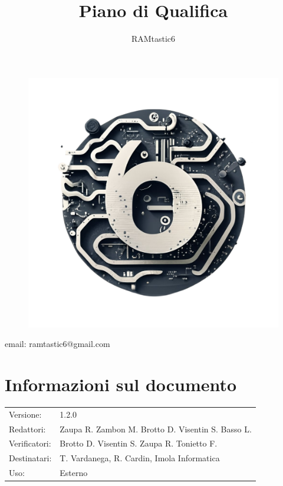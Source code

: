 \documentclass[12pt, oneside]{article}
\author{RAMtastic6}
\begin{document}
\thispagestyle{empty}
\title{Piano di Qualifica}
\maketitle
\begin{figure}[h]
  \centering
  \includegraphics[scale=0.3]{logo.png}
\end{figure}
\begin{center}
    email: ramtastic6@gmail.com
\end{center}

\section*{Informazioni sul documento}
\begin{tabular}{ll}
Versione: & 1.2.0 \\
Redattori: & Zaupa R. Zambon M. Brotto D. Visentin S. Basso L.\\
Verificatori: & Brotto D. Visentin S. Zaupa R. Tonietto F.\\ 
Destinatari: & T. Vardanega, R. Cardin, Imola Informatica \\
Uso: & Esterno
\end{tabular}
\newpage

\end{document}
